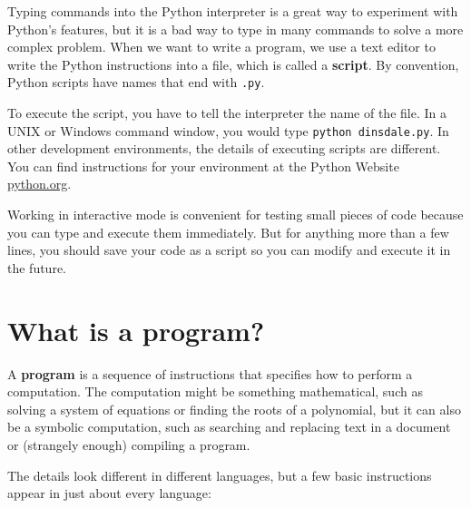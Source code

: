 \documentclass[10pt]{book}
\begin{document}

Typing commands into the Python interpreter is a great way to experiment
with Python's features, but it is a bad way to type in many commands 
to solve a more complex problem.  When we want to write a program, 
we use a text editor to write the Python instructions into a file,
which is called a {\bf script}.  By
convention, Python scripts have names that end with {\tt .py}.


To execute the script, you have to tell the interpreter the name of
the file.  In a UNIX or Windows command window, you would type {\tt python
dinsdale.py}.  In other development environments, the details of
executing scripts are different.  You can find instructions for
your environment at the Python Website \url{python.org}.


Working in interactive mode is convenient for testing small pieces of
code because you can type and execute them immediately.  But for
anything more than a few lines, you should save your code
as a script so you can modify and execute it in the future.


\section{What is a program?}

A {\bf program} is a sequence of instructions that specifies how to
perform a computation.  The computation might be something
mathematical, such as solving a system of equations or finding the
roots of a polynomial, but it can also be a symbolic computation, such
as searching and replacing text in a document or (strangely enough)
compiling a program.


The details look different in different languages, but a few basic
instructions appear in just about every language:
\end{document}
